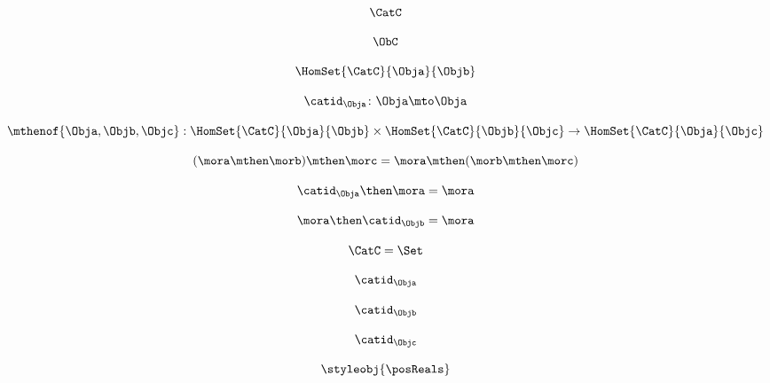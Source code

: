 {\begin{forslides}
		\begin{equation}
			\label{eq:15}
			\CatC
		\end{equation}

		\begin{equation}
			\label{eq:16}
			\ObC
		\end{equation}

		\begin{equation}
			\label{eq:17}
			\HomSet{\CatC}{\Obja}{\Objb}
		\end{equation}

		\begin{equation}
			\label{eq:18}
			\catid_{\Obja}\colon \Obja \mto \Obja
		\end{equation}

		\begin{equation}
			\label{eq:19}
			\mthenof{\Obja,\Objb,\Objc}: \HomSet{\CatC}{\Obja}{\Objb} \times \HomSet{\CatC}{\Objb}{\Objc}\to \HomSet{\CatC}{\Obja}{\Objc}
		\end{equation}

		\begin{equation}
			\label{eq:20}
			(\mora\mthen \morb)
			\mthen \morc= \mora \mthen (\morb \mthen \morc)
		\end{equation}

		\begin{equation}
			\label{eq:21}
			\catid_{\Obja} \then \mora = \mora
		\end{equation}

		\begin{equation}
			\label{eq:22}
			\mora \then \catid_{\Objb} = \mora
		\end{equation}

		\begin{equation}
			\label{eq:23}
			\CatC = \Set
		\end{equation}

		\begin{equation}
			\label{eq:24}
			\catid_{\Obja}
		\end{equation}

		\begin{equation}
			\label{eq:25}
			\catid_{\Objb}
		\end{equation}

		\begin{equation}
			\label{eq:26}
			\catid_{\Objc}
		\end{equation}

		\begin{equation}
			\label{eq:27}
			\styleobj{\posReals}
		\end{equation}


\end{forslides}}
